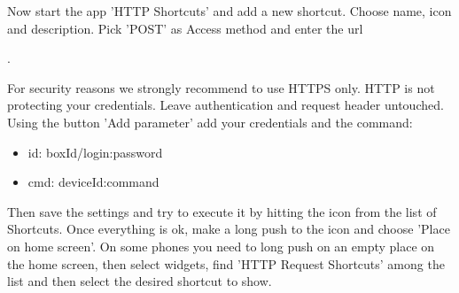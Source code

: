 Now start the app 'HTTP Shortcuts' and add a new shortcut. Choose name, icon and 
description. Pick 'POST' as Access method and enter the url 

.

For security reasons we strongly recommend to use HTTPS only. HTTP is not protecting your credentials.
Leave authentication and request header untouched. Using the button 'Add parameter' add your 
credentials and the command:
\begin{itemize}
\item id: boxId/login:password 
\item cmd: deviceId:command
\end{itemize}

Then save the settings and try to execute it by hitting the icon from the list of Shortcuts.
Once everything is ok, make a long push to the icon and choose 'Place on home screen'.
On some phones you need to long push on an empty place on the home screen, then select widgets,
find 'HTTP Request Shortcuts' among the list and then select the desired shortcut to show.





